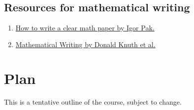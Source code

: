 \documentclass[11pt]{article}
\begin{document}
\subsection{Resources for mathematical writing}
\label{sec:orga63b5ce}
\begin{enumerate}
\item \href{https://www.math.ucla.edu/\~pak/papers/how-to-write1.pdf}{How to write a clear math paper by Igor Pak.}
\item \href{https://jmlr.csail.mit.edu/reviewing-papers/knuth\_mathematical\_writing.pdf}{Mathematical Writing by Donald Knuth et al.}
\end{enumerate}

\section{Plan}
\label{sec:orgee0187c}
This is a tentative outline of the course, subject to change.
\end{document}
